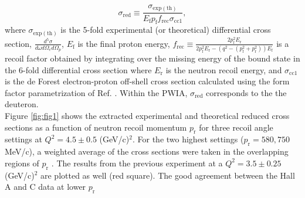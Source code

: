 {%
}
\DIFdelend \begin{equation}
\sigma_{\mathrm{red}} \equiv \frac{\sigma_{\mathrm{exp(th)}}}{E_{\mathrm{f}}p_{\mathrm{f}}f_{\mathrm{rec}}\sigma_{\mathrm{cc1}}},
\label{eq:1}
\end{equation}
\noindent where $\sigma_{\mathrm{exp(th)}}$ is the 5-fold experimental (or theoretical) differential cross section, $\frac{d^{5}\sigma}{d\omega d\Omega_{e} d\Omega_{p}}$,
$E_{\mathrm{f}}$ is the final proton energy, $f_{\mathrm{rec}}\equiv \frac{2p_{\mathrm{f}}^{2}E_{\mathrm{r}}}{2p_{\mathrm{f}}^{2}E_{\mathrm{r}} - (q^{2} - (p_{\mathrm{f}}^{2} + p_{\mathrm{r}}^{2}))E_{\mathrm{f}}}$
is a recoil factor obtained by integrating over the missing energy of the bound state in the 6-fold differential cross section where $E_{\mathrm{r}}$ is the neutron recoil energy, and $\sigma_{\mathrm{cc1}}$ is the
de Forest \cite{DEFOREST1983} electron-proton off-shell cross section calculated using the form factor parametrization of Ref. \cite{PhysRevC.69.022201}.
Within the PWIA, $\sigma_{\mathrm{red}}$ corresponds to the \DIFdelbegin {}\DIFdelend \DIFaddbegin {}\DIFaddend the deuteron. \\
\indent Figure \ref{fig:fig1} shows the extracted experimental and theoretical reduced cross sections as a function of neutron recoil momentum
$p_{\mathrm{r}}$ for three recoil angle settings at $Q^{2}=4.5\pm0.5$ (GeV/c)$^{2}$. For the two highest \DIFaddbegin {}\DIFaddend settings ($p_{\mathrm{r}}=580, 750$ MeV/c), a weighted average of the cross sections were taken in the overlapping regions of $p_{\mathrm{r}}$ . The results from the previous experiment \cite{PhysRevLett.107.262501} at a $Q^{2}=3.5\pm0.25$ (GeV/c)$^{2}$ are plotted as well (red square). The good agreement between the Hall A and C data at lower $p_{\mathrm{r}}$
